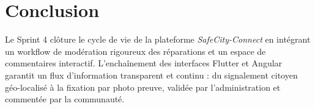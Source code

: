 \section*{Conclusion}
Le Sprint 4 clôture le cycle de vie de la plateforme \textit{SafeCity-Connect} en intégrant un workflow de modération rigoureux des réparations et un espace de commentaires interactif. L'enchaînement des interfaces Flutter et Angular garantit un flux d'information transparent et continu : du signalement citoyen géo-localisé à la fixation par photo preuve, validée par l'administration et commentée par la communauté.
